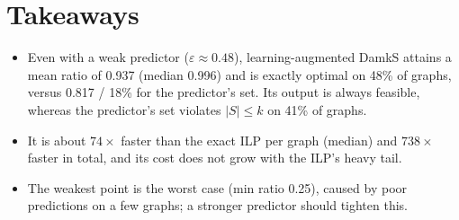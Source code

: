 \documentclass[11pt]{article}
\begin{document}
\section{Takeaways}
\begin{itemize}
  \item Even with a weak predictor ($\varepsilon\approx 0.48$), learning-augmented DamkS
  attains a mean ratio of 0.937 (median 0.996) and is exactly optimal on 48\% of graphs,
  versus 0.817 / 18\% for the predictor's set. Its output is always feasible, whereas the
  predictor's set violates $|S|\le k$ on 41\% of graphs.
  \item It is about $74\times$ faster than the exact ILP per graph (median) and $738\times$
  faster in total, and its cost does not grow with the ILP's heavy tail.
  \item The weakest point is the worst case (min ratio 0.25), caused by poor predictions on a
  few graphs; a stronger predictor should tighten this.
\end{itemize}
\end{document}

